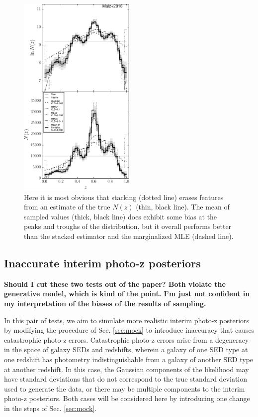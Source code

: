 \documentclass[preprint]{aastex}
\begin{document}
\begin{figure}
\includegraphics[width=0.5\textwidth]{figs/sig4/comps.pdf}
\caption{Here it is most obvious that stacking (dotted line) erases features 
from an estimate of the true $N(z)$ (thin, black line).  The mean of sampled 
values (thick, black line) does exhibit some bias at the peaks and troughs of 
the distribution, but it overall performs better than the stacked estimator and 
the marginalized MLE (dashed line).}
\label{fig:sig4-comp}
\end{figure}

\clearpage
\subsection{Inaccurate interim photo-z posteriors}
\label{sec:multi}

\textbf{Should I cut these two tests out of the paper?  Both violate the 
generative model, which is kind of the point.  I'm just not confident in my 
interpretation of the biases of the results of sampling.}

In this pair of tests, we aim to simulate more realistic interim photo-z 
posteriors by modifying the procedure of Sec. \ref{sec:mock} to introduce 
inaccuracy that causes catastrophic photo-z errors.  Catastrophic photo-z 
errors arise from a degeneracy in the space of galaxy SEDs and redshifts, 
wherein a galaxy of one SED type at one redshift has photometry 
indistinguishable from a galaxy of another SED type at another redshift.  In 
this case, the Gaussian components of the likelihood may have standard 
deviations that do not correspond to the true standard deviation used to 
generate the data, or there may be multiple components to the interim photo-z 
posteriors.  Both cases will be considered here by introducing one change in 
the steps of Sec. \ref{sec:mock}.  
\end{document}
